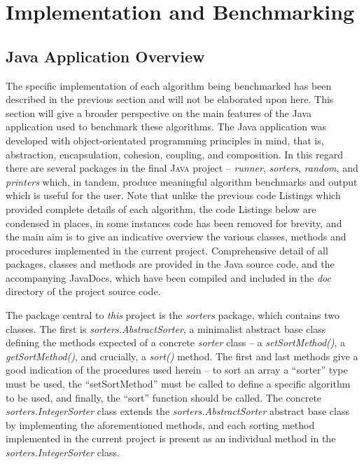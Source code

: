 \documentclass[12pt,a4paper]{article}
\begin{document}
\section{Implementation and Benchmarking}
\subsection{Java Application Overview}
The specific implementation of each algorithm being benchmarked has been described in the previous section and will not be elaborated upon here. This section will give a broader perspective on the main features of the Java application used to benchmark these algorithms. The Java application was developed with object-orientated programming principles in mind, that is, abstraction, encapsulation, cohesion, coupling, and composition. In this regard there are several packages in the final \textsc{Java} project -- \emph{runner}, \emph{sorters}, \emph{random}, and \emph{printers} which, in tandem, produce meaningful algorithm benchmarks and output which is useful for the user. Note that unlike the previous code Listings which provided complete details of each algorithm, the code Listings below are condensed in places, in some instances code has been removed for brevity, and the main aim is to give an indicative overview the various classes, methods and procedures implemented in the current project. Comprehensive detail of all packages, classes and methods are provided in the Java source code, and the accompanying JavaDocs, which have been compiled and included in the \emph{doc} directory of the project source code.

The package central to \emph{this} project is the \emph{sorters} package, which contains two classes. The first is \emph{sorters.AbstractSorter}, a minimalist abstract base class defining the methods expected of a concrete \emph{sorter} class -- a \emph{setSortMethod()}, a \emph{getSortMethod()}, and crucially, a \emph{sort()} method. The first and last methods give a good indication of the procedures used herein -- to sort an array a ``sorter'' type must be used, the ``setSortMethod'' must be called to define a specific algorithm to be used, and finally, the ``sort'' function should be called. The concrete \emph{sorters.IntegerSorter} class extends the \emph{sorters.AbstractSorter} abstract base class by implementing the aforementioned methods, and each sorting method implemented in the current project is present as an individual method in the \emph{sorters.IntegerSorter} class. 
\end{document}
